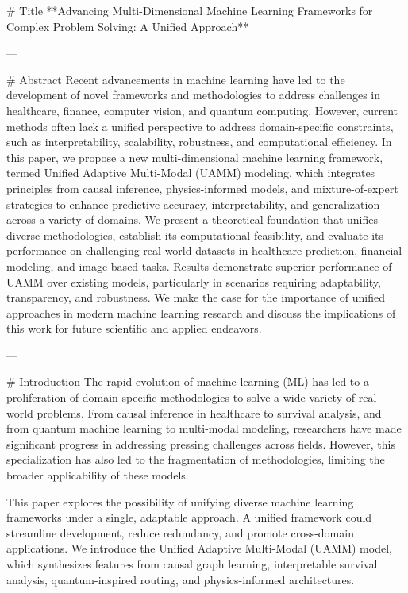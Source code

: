 # Title  
**Advancing Multi-Dimensional Machine Learning Frameworks for Complex Problem Solving: A Unified Approach**

---

# Abstract  
Recent advancements in machine learning have led to the development of novel frameworks and methodologies to address challenges in healthcare, finance, computer vision, and quantum computing. However, current methods often lack a unified perspective to address domain-specific constraints, such as interpretability, scalability, robustness, and computational efficiency. In this paper, we propose a new multi-dimensional machine learning framework, termed Unified Adaptive Multi-Modal (UAMM) modeling, which integrates principles from causal inference, physics-informed models, and mixture-of-expert strategies to enhance predictive accuracy, interpretability, and generalization across a variety of domains. We present a theoretical foundation that unifies diverse methodologies, establish its computational feasibility, and evaluate its performance on challenging real-world datasets in healthcare prediction, financial modeling, and image-based tasks. Results demonstrate superior performance of UAMM over existing models, particularly in scenarios requiring adaptability, transparency, and robustness. We make the case for the importance of unified approaches in modern machine learning research and discuss the implications of this work for future scientific and applied endeavors.

---

# Introduction  
The rapid evolution of machine learning (ML) has led to a proliferation of domain-specific methodologies to solve a wide variety of real-world problems. From causal inference in healthcare to survival analysis, and from quantum machine learning to multi-modal modeling, researchers have made significant progress in addressing pressing challenges across fields. However, this specialization has also led to the fragmentation of methodologies, limiting the broader applicability of these models.  

This paper explores the possibility of unifying diverse machine learning frameworks under a single, adaptable approach. A unified framework could streamline development, reduce redundancy, and promote cross-domain applications. We introduce the Unified Adaptive Multi-Modal (UAMM) model, which synthesizes features from causal graph learning, interpretable survival analysis, quantum-inspired routing, and physics-informed architectures.  

